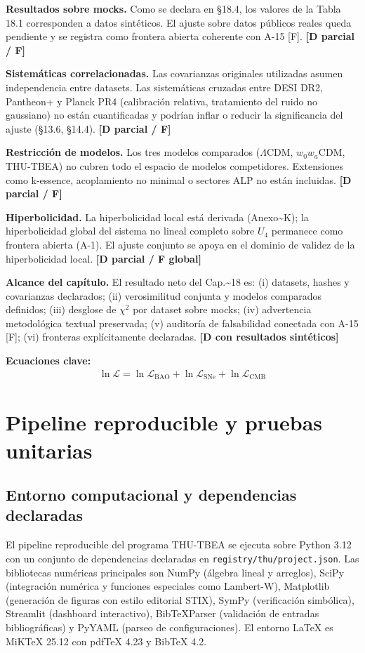﻿\documentclass[11pt,letterpaper]{article}
\begin{document}
\textbf{Resultados sobre mocks.} Como se declara en §18.4, los valores de la Tabla 18.1 corresponden a datos sintéticos. El ajuste sobre datos públicos reales queda pendiente y se registra como frontera abierta coherente con A-15 [F]. \textbf{[D parcial / F]}

\textbf{Sistemáticas correlacionadas.} Las covarianzas originales utilizadas asumen independencia entre datasets. Las sistemáticas cruzadas entre DESI DR2, Pantheon+ y Planck PR4 (calibración relativa, tratamiento del ruido no gaussiano) no están cuantificadas y podrían inflar o reducir la significancia del ajuste (§13.6, §14.4). \textbf{[D parcial / F]}

\textbf{Restricción de modelos.} Los tres modelos comparados ($\Lambda$CDM, $w_0w_a$CDM, THU-TBEA) no cubren todo el espacio de modelos competidores. Extensiones como k-essence, acoplamiento no minimal o sectores ALP no están incluidas. \textbf{[D parcial / F]}

\textbf{Hiperbolicidad.} La hiperbolicidad local está derivada (Anexo\textasciitilde{}K); la hiperbolicidad global del sistema no lineal completo sobre $U_4$ permanece como frontera abierta (A-1). El ajuste conjunto se apoya en el dominio de validez de la hiperbolicidad local. \textbf{[D parcial / F global]}

\textbf{Alcance del capítulo.} El resultado neto del Cap.\textasciitilde{}18 es: (i) datasets, hashes y covarianzas declarados; (ii) verosimilitud conjunta y modelos comparados definidos; (iii) desglose de $\chi^2$ por dataset sobre mocks; (iv) advertencia metodológica textual preservada; (v) auditoría de falsabilidad conectada con A-15 [F]; (vi) fronteras explícitamente declaradas. \textbf{[D con resultados sintéticos]}

\textbf{Ecuaciones clave:}
\begin{align*}
    \ln\mathcal{L} = \ln\mathcal{L}_{\mathrm{BAO}} + \ln\mathcal{L}_{\mathrm{SNe}} + \ln\mathcal{L}_{\mathrm{CMB}}
\end{align*}
\section{Pipeline reproducible y pruebas unitarias}
\subsection{Entorno computacional y dependencias declaradas}
El pipeline reproducible del programa THU-TBEA se ejecuta sobre Python 3.12 con un conjunto de dependencias declaradas en \texttt{registry/thu/project.json}. Las bibliotecas numéricas principales son NumPy (álgebra lineal y arreglos), SciPy (integración numérica y funciones especiales como Lambert-W), Matplotlib (generación de figuras con estilo editorial STIX), SymPy (verificación simbólica), Streamlit (dashboard interactivo), BibTeXParser (validación de entradas bibliográficas) y PyYAML (parseo de configuraciones). El entorno LaTeX es MiKTeX 25.12 con pdfTeX 4.23 y BibTeX 4.2.
\end{document}
